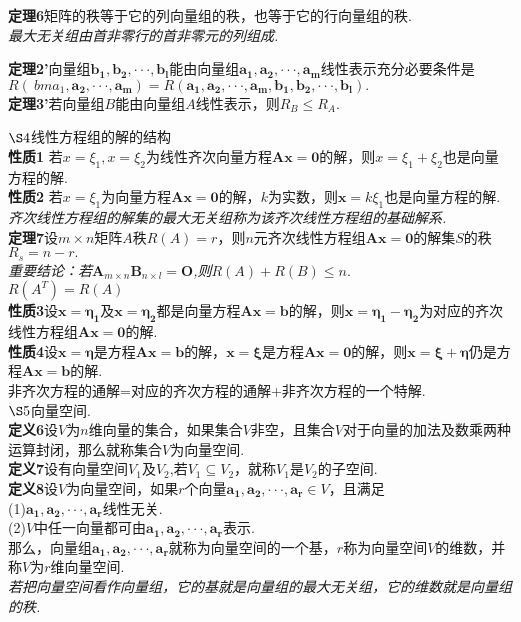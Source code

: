 \documentclass[UTF8]{ctexart}
\begin{document}
 \textbf{定理6}\quad 矩阵的秩等于它的列向量组的秩，也等于它的行向量组的秩.
\\ \emph{最大无关组由首非零行的首非零元的列组成.}

 \textbf{定理2’}\quad 向量组$\bm{b_1},\bm{b_2},\cdot\cdot\cdot,\bm{b_l}$能由向量组$ \bm{a_1},\bm{a_2},\cdot\cdot\cdot,\bm{a_m}$线性表示充分必要条件是$R(\ bm{a_1},\bm{a_2},\cdot\cdot\cdot,\bm{a_m})=R( \bm{a_1},\bm{a_2},\cdot\cdot\cdot,\bm{a_m},\bm{b_1},\bm{b_2},\cdot\cdot\cdot,\bm{b_l}).$
\\  \indent \textbf{定理3’}\quad 若向量组$B$能由向量组$A$线性表示，则$R_B\leq R_A.$

 \noindent $\S4$\quad 线性方程组的解的结构
 \\ \textbf{性质1} \quad 若$x=\xi_1,x=\xi_2$为线性齐次向量方程$\bm{Ax}=\bm{0}$的解，则$x=\xi_1+\xi_2$也是向量方程的解.
 \\ \textbf{性质2} \quad 若$x=\xi_1$为向量方程$\bm{Ax}=\bm{0}$的解，$k$为实数，则$\bm{x}=k\xi_1$也是向量方程的解.
 \\ \emph{齐次线性方程组的解集的最大无关组称为该齐次线性方程组的基础解系.}
 \\ \textbf{定理7}\quad 设$m\times n$矩阵$A$秩$R(A)=r$，则$n$元齐次线性方程组$\bm{Ax}=\bm{0}$的解集$S$的秩$R_s=n-r.$
 \\ \emph{重要结论：若$\bm{A}_{m\times n}\bm{B}_{n \times l}=\bm{O}$,则$R(A)+R(B) \leq n.$
 \\$R(A^T)=R(A)$}
 \\ \textbf{性质3}\quad 设$\bm{x}=\bm{\eta_1}$及$\bm{x}=\bm{\eta_2}$都是向量方程$\bm{Ax}=\bm{b}$的解，则$\bm{x}=\bm{\eta_1-\eta_2}$为对应的齐次线性方程组$\bm{Ax}=\bm{0}$的解.
 \\ \textbf{性质4}\quad 设$\bm{x}=\bm{\eta}$是方程$\bm{Ax}=\bm{b}$的解，$\bm{x}=\bm{\xi}$是方程$\bm{Ax}=\bm{0}$的解，则$\bm{x}=\bm{\xi}+\bm{\eta}$仍是方程$\bm{Ax}=\bm{b}$的解.
 \\ 非齐次方程的通解=对应的齐次方程的通解+非齐次方程的一个特解.
 \\ $\S5$\quad 向量空间.
 \\ \textbf{定义6}\quad 设$V$为$n$维向量的集合，如果集合$V$非空，且集合$V$对于向量的加法及数乘两种运算封闭，那么就称集合$V$为向量空间.
 \\ \textbf{定义7}\quad 设有向量空间$V_1$及$V_2$,若$V_1 \subseteq V_2 $，就称$V_1$是$V_2$的子空间.
 \\ \textbf{定义8}\quad 设$V$为向量空间，如果$r$个向量$\bm{a_1},\bm{a_2},\cdot\cdot\cdot,\bm{a_r}\in V$，且满足
 \\ (1)$\bm{a_1},\bm{a_2},\cdot\cdot\cdot,\bm{a_r}$线性无关.
 \\(2)$V$中任一向量都可由$\bm{a_1},\bm{a_2},\cdot\cdot\cdot,\bm{a_r}$表示.
 \\ 那么，向量组$\bm{a_1},\bm{a_2},\cdot\cdot\cdot,\bm{a_r}$就称为向量空间的一个基，$r$称为向量空间$V$的维数，并称$V$为$r$维向量空间.
 \\ \emph{若把向量空间看作向量组，它的基就是向量组的最大无关组，它的维数就是向量组的秩.}
 
\end{document}
